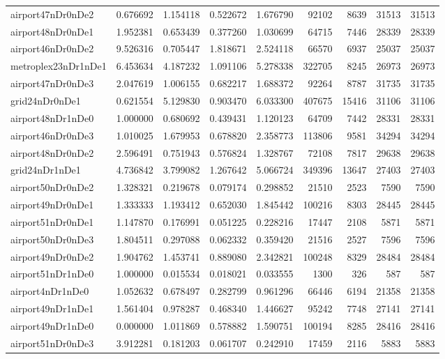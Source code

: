 \begin{longtable}{|l|r|r|r|r|r|r|r|r|}
airport47nDr0nDe2 & 0.676692 & 1.154118 & 0.522672 & 1.676790 & 92102 & 8639 & 31513 & 31513 \\
airport48nDr0nDe1 & 1.952381 & 0.653439 & 0.377260 & 1.030699 & 64715 & 7446 & 28339 & 28339 \\
airport46nDr0nDe2 & 9.526316 & 0.705447 & 1.818671 & 2.524118 & 66570 & 6937 & 25037 & 25037 \\
metroplex23nDr1nDe1 & 6.453634 & 4.187232 & 1.091106 & 5.278338 & 322705 & 8245 & 26973 & 26973 \\
airport47nDr0nDe3 & 2.047619 & 1.006155 & 0.682217 & 1.688372 & 92264 & 8787 & 31735 & 31735 \\
grid24nDr0nDe1 & 0.621554 & 5.129830 & 0.903470 & 6.033300 & 407675 & 15416 & 31106 & 31106 \\
airport48nDr1nDe0 & 1.000000 & 0.680692 & 0.439431 & 1.120123 & 64709 & 7442 & 28331 & 28331 \\
airport46nDr0nDe3 & 1.010025 & 1.679953 & 0.678820 & 2.358773 & 113806 & 9581 & 34294 & 34294 \\
airport48nDr0nDe2 & 2.596491 & 0.751943 & 0.576824 & 1.328767 & 72108 & 7817 & 29638 & 29638 \\
grid24nDr1nDe1 & 4.736842 & 3.799082 & 1.267642 & 5.066724 & 349396 & 13647 & 27403 & 27403 \\
airport50nDr0nDe2 & 1.328321 & 0.219678 & 0.079174 & 0.298852 & 21510 & 2523 & 7590 & 7590 \\
airport49nDr0nDe1 & 1.333333 & 1.193412 & 0.652030 & 1.845442 & 100216 & 8303 & 28445 & 28445 \\
airport51nDr0nDe1 & 1.147870 & 0.176991 & 0.051225 & 0.228216 & 17447 & 2108 & 5871 & 5871 \\
airport50nDr0nDe3 & 1.804511 & 0.297088 & 0.062332 & 0.359420 & 21516 & 2527 & 7596 & 7596 \\
airport49nDr0nDe2 & 1.904762 & 1.453741 & 0.889080 & 2.342821 & 100248 & 8329 & 28484 & 28484 \\
airport51nDr1nDe0 & 1.000000 & 0.015534 & 0.018021 & 0.033555 & 1300 & 326 & 587 & 587 \\
airport4nDr1nDe0 & 1.052632 & 0.678497 & 0.282799 & 0.961296 & 66446 & 6194 & 21358 & 21358 \\
airport49nDr1nDe1 & 1.561404 & 0.978287 & 0.468340 & 1.446627 & 95242 & 7748 & 27141 & 27141 \\
airport49nDr1nDe0 & 0.000000 & 1.011869 & 0.578882 & 1.590751 & 100194 & 8285 & 28416 & 28416 \\
airport51nDr0nDe3 & 3.912281 & 0.181203 & 0.061707 & 0.242910 & 17459 & 2116 & 5883 & 5883 \\

\end{longtable}
